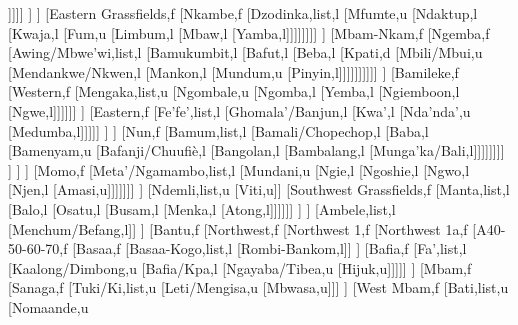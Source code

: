 \documentclass[landscape]{standalone}
\begin{document}
\begin{forest}
											[Isu,u
											[Laimbie,u
											[Weh,u
											[Zhoa,u]]]]]
										]%
									]%
									[Eastern Grassfields,f
										[Nkambe,f
											[Dzodinka,list,l
											[Mfumte,u
											[Ndaktup,l
											[Kwaja,l
											[Fum,u
											[Limbum,l
											[Mbaw,l
											[Yamba,l]]]]]]]]
										]%
										[Mbam-Nkam,f
											[Ngemba,f
												[Awing/Mbwe'wi,list,l
												[Bamukumbit,l
												[Bafut,l
												[Beba,l
												[Kpati,d
												[Mbili/Mbui,u
												[Mendankwe/Nkwen,l
												[Mankon,l
												[Mundum,u
												[Pinyin,l]]]]]]]]]]
											]%
											[Bamileke,f
												[Western,f
													[Mengaka,list,u
													[Ngombale,u
													[Ngomba,l
													[Yemba,l
													[Ngiemboon,l
													[Ngwe,l]]]]]]
												]%
												[Eastern,f
													[Fe'fe',list,l
													[Ghomala'/Banjun,l
													[Kwa',l
													[Nda'nda',u
													[Medumba,l]]]]]
												]%
											]%
											[Nun,f
												[Bamum,list,l
												[Bamali/Chopechop,l
												[Baba,l
												[Bamenyam,u
												[Bafanji/Chuufiè,l
												[Bangolan,l
												[Bambalang,l
												[Munga'ka/Bali,l]]]]]]]]
											]%
										]%
									]%
									[Momo,f
										[Meta'/Ngamambo,list,l
										[Mundani,u
										[Ngie,l
										[Ngoshie,l
										[Ngwo,l
										[Njen,l
										[Amasi,u]]]]]]]
									]%
									[Ndemli,list,u
									[Viti,u]]
									[Southwest Grassfields,f
										[Manta,list,l
										[Balo,l
										[Osatu,l
										[Busam,l
										[Menka,l
										[Atong,l]]]]]]
									]%
								]%
								[Ambele,list,l
								[Menchum/Befang,l]]
							]%
							[Bantu,f
								[Northwest,f
									[Northwest 1,f
										[Northwest 1a,f
											[A40-50-60-70,f
												[Basaa,f
													[Basaa-Kogo,list,l
													[Rombi-Bankom,l]]
												]%
												[Bafia,f
													[Fa',list,l
													[Kaalong/Dimbong,u
													[Bafia/Kpa,l
													[Ngayaba/Tibea,u
													[Hijuk,u]]]]]
												]%
												[Mbam,f
													[Sanaga,f
														[Tuki/Ki,list,u
														[Leti/Mengisa,u
														[Mbwasa,u]]]
													]%
													[West Mbam,f
														[Bati,list,u
														[Nomaande,u

\end{forest}
\end{document}
